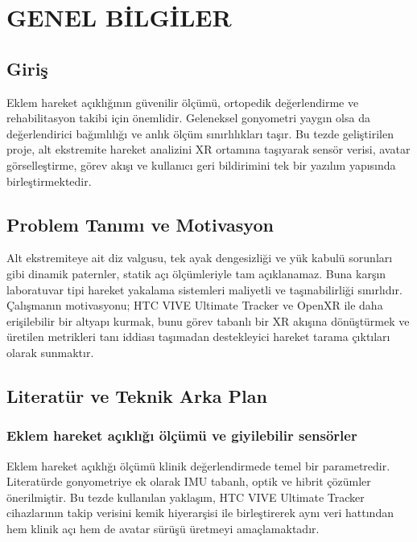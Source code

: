 \documentclass[12pt,a4paper,oneside]{report}
\begin{document}
\setcounter{figure}{0}
\setcounter{table}{0}

\clearpage
{}
\setcounter{page}{1}

\chapter{GENEL BİLGİLER}

\section{Giriş}
Eklem hareket açıklığının güvenilir ölçümü, ortopedik değerlendirme ve rehabilitasyon takibi için önemlidir. Geleneksel gonyometri yaygın olsa da değerlendirici bağımlılığı ve anlık ölçüm sınırlılıkları taşır. Bu tezde geliştirilen proje, alt ekstremite hareket analizini XR ortamına taşıyarak sensör verisi, avatar görselleştirme, görev akışı ve kullanıcı geri bildirimini tek bir yazılım yapısında birleştirmektedir.

\section{Problem Tanımı ve Motivasyon}
Alt ekstremiteye ait diz valgusu, tek ayak dengesizliği ve yük kabulü sorunları gibi dinamik paternler, statik açı ölçümleriyle tam açıklanamaz. Buna karşın laboratuvar tipi hareket yakalama sistemleri maliyetli ve taşınabilirliği sınırlıdır. Çalışmanın motivasyonu; HTC VIVE Ultimate Tracker ve OpenXR ile daha erişilebilir bir altyapı kurmak, bunu görev tabanlı bir XR akışına dönüştürmek ve üretilen metrikleri tanı iddiası taşımadan destekleyici hareket tarama çıktıları olarak sunmaktır.

\section{Literatür ve Teknik Arka Plan}

\subsection{Eklem hareket açıklığı ölçümü ve giyilebilir sensörler}
Eklem hareket açıklığı ölçümü klinik değerlendirmede temel bir parametredir. Literatürde gonyometriye ek olarak IMU tabanlı, optik ve hibrit çözümler önerilmiştir. Bu tezde kullanılan yaklaşım, HTC VIVE Ultimate Tracker cihazlarının takip verisini kemik hiyerarşisi ile birleştirerek aynı veri hattından hem klinik açı hem de avatar sürüşü üretmeyi amaçlamaktadır.
\end{document}

